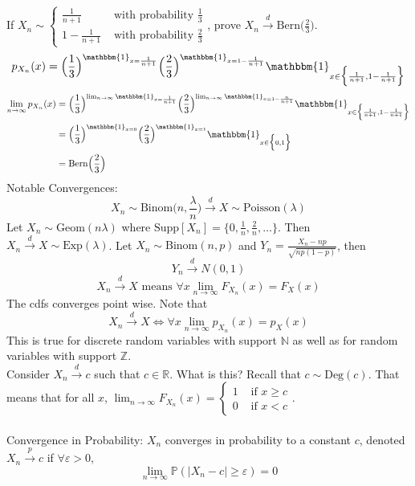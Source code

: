 \documentclass[12pt]{article}
\newcommand{\prob}[1]{\mathbb{P}(#1)}
\newcommand{\indicator}[1]{\mathbbm{1}_{#1}}
\newcommand{\supp}[1]{\text{Supp}[ #1 ]}
\newcommand{\set}[1]{\Big\{ #1 \Big\}}
\begin{document}
 If $X_n \sim \begin{cases} \frac{1}{n+1} &\text{ with probability } \frac{1}{3} \\ 1 - \frac{1}{n+1} &\text{ with probability } \frac{2}{3} \end{cases}$, prove $X_n \stackrel{d}{\to} \text{Bern}\Big( \frac{2}{3}\Big)$. 
 $$ p_{X_n}(x) = \Big( \frac{1}{3}\Big)^{\indicator{x = \frac{1}{n+1}}} \Big( \frac{2}{3} \Big)^{\indicator{x = 1 - \frac{1}{n+1}}}\indicator{x \in \set{ \frac{1}{n+1}, 1 - \frac{1}{n+1}}} $$ 
 $$ \begin{aligned} \lim_{n \to \infty} p_{X_n}(x) &= \Big( \frac{1}{3} \Big)^{\lim_{n \to \infty} \indicator{x = \frac{1}{n+1}}} \Big( \frac{2}{3} \Big)^{\lim_{n \to \infty} \indicator{x = 1 - \frac{n}{n+1}}} \indicator{x \in \set{ \frac{1}{n+1}, 1 - \frac{1}{n+1}}} \\ &= \Big( \frac{1}{3} \Big)^{\indicator{x = 0}} \Big( \frac{2}{3} \Big)^{\indicator{x = 1}} \indicator{x \in \set{0,1}} \\ &= \text{Bern}\Big( \frac{2}{3} \Big) \end{aligned} $$ 
Notable Convergences: $$ X_n \sim \text{Binom}\Big( n, \frac{\lambda}{n}\Big) \stackrel{d}{\to} X \sim \text{Poisson}(\lambda)$$ 
Let $X_n \sim \text{Geom}(n\lambda)$ where $\supp{X_n} = \set{0, \frac{1}{n}, \frac{2}{n}, \dots}$. Then $X_n \stackrel{d}{\to} X \sim \text{Exp}(\lambda)$. 
Let $X_n \sim \text{Binom}(n,p)$ and $Y_n = \frac{X_n - np}{\sqrt{np(1-p)}}$, then 
$$Y_n \stackrel{d}{\to} N(0, 1) $$ 
$$ X_n \stackrel{d}{\to} X \text{ means } \forall x \lim_{n \to \infty} F_{X_{n}}(x) = F_X(x) $$ The cdfs converges point wise. Note that 
$$ X_n \stackrel{d}{\to} X \iff \forall x \lim_{n \to \infty} p_{X_n}(x) = p_X(x) $$ 
This is true for discrete random variables with support $\mathbb{N}$ as well as for random variables with support $\mathbb{Z}$. \\
Consider $X_n \stackrel{d}{\to} c$ such that $c \in \mathbb{R}$. What is this? Recall that $c \sim \text{Deg}(c)$. That means that for all $x$, $\lim_{n \to \infty} F_{X_n}(x) = \begin{cases} 1 &\text{ if } x \geq c \\ 0 &\text{ if } x < c \end{cases} $. \\~\\
Convergence in Probability: $X_n$ converges in probability to a constant $c$, denoted $X_n \stackrel{p}{\to} c$ if $\forall \varepsilon > 0$, $$ \lim_{n \to \infty } \prob{|X_n - c| \geq \varepsilon} = 0 $$ 
\end{document}
